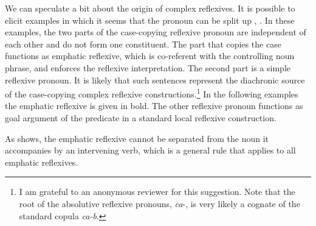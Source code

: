 We can speculate a bit about the origin of complex reflexives. It is possible to elicit examples in which it seems that the pronoun can be split up , . In these examples, the two parts of the case-copying reflexive pronoun are independent of each other and do not form one constituent. The part that copies the case functions as emphatic reflexive, which is co-referent with the controlling noun phrase, and enforces the reflexive interpretation. The second part is a simple reflexive pronoun. It is likely that such sentences represent the diachronic source of the case-copying complex reflexive constructions.\footnote{I am grateful to an anonymous reviewer for this suggestion. Note that the root of the absolutive reflexive pronouns, \textit{ca}-, is very likely a cognate of the standard copula \textit{ca-b}.} In the following examples  the emphatic reflexive is given in bold. The other reflexive pronoun functions as goal argument of the predicate  in a standard local reflexive construction.
%
\begin{exe}
	\ex	\label{ex:Rashid will you please stop staring at the mirror}
	\begin{xlist}
		\ex	{}		\label{ex:Rashid will you please stop staring at the mirror@A}

		\ex	{}		\label{ex:Rashid will you please stop staring at the mirror@B}
	\end{xlist}
\end{exe}

As  shows, the emphatic reflexive cannot be separated from the noun it accompanies by an intervening verb, which is a general rule that applies to all emphatic reflexives.
%
\begin{exe}
	\ex	{}		\label{ex:Rashid will you please stop staring at the mirror@C}
\end{exe}


